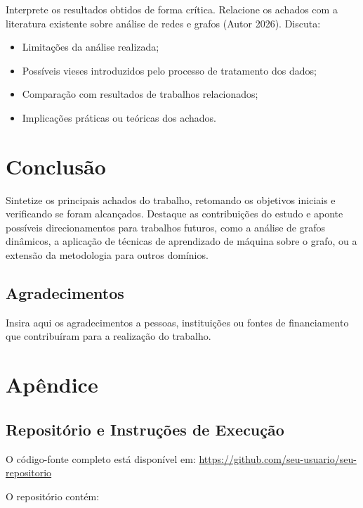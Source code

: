 \documentclass[sigconf]{webmedia}
\providecommand{\tightlist}{%
  \setlength{\itemsep}{0pt}\setlength{\parskip}{0pt}}
\begin{document}
Interprete os resultados obtidos de forma crítica. Relacione os achados
com a literatura existente sobre análise de redes e grafos (Autor 2026).
Discuta:

\begin{itemize}
\tightlist
\item
  Limitações da análise realizada;
\item
  Possíveis vieses introduzidos pelo processo de tratamento dos dados;
\item
  Comparação com resultados de trabalhos relacionados;
\item
  Implicações práticas ou teóricas dos achados.
\end{itemize}

\section{Conclusão}\label{conclusuxe3o}

Sintetize os principais achados do trabalho, retomando os objetivos
iniciais e verificando se foram alcançados. Destaque as contribuições do
estudo e aponte possíveis direcionamentos para trabalhos futuros, como a
análise de grafos dinâmicos, a aplicação de técnicas de aprendizado de
máquina sobre o grafo, ou a extensão da metodologia para outros
domínios.

\subsection*{Agradecimentos}\label{agradecimentos}

Insira aqui os agradecimentos a pessoas, instituições ou fontes de
financiamento que contribuíram para a realização do trabalho.

\section*{Apêndice}\label{apuxeandice}

\subsection{Repositório e Instruções de
Execução}\label{reposituxf3rio-e-instruuxe7uxf5es-de-execuuxe7uxe3o}

O código-fonte completo está disponível em:
\url{https://github.com/seu-usuario/seu-repositorio}

O repositório contém:
\end{document}
